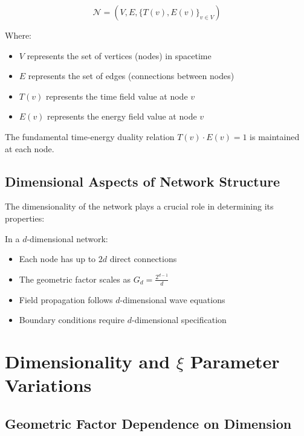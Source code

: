 \documentclass[12pt,a4paper]{article}
\begin{document}
	\begin{equation}
		\mathcal{N} = (V, E, \{T(v), E(v)\}_{v \in V})
	\end{equation}
	
	Where:
	\begin{itemize}
		\item $V$ represents the set of vertices (nodes) in spacetime
		\item $E$ represents the set of edges (connections between nodes)
		\item $T(v)$ represents the time field value at node $v$
		\item $E(v)$ represents the energy field value at node $v$
	\end{itemize}
	
	The fundamental time-energy duality relation $T(v) \cdot E(v) = 1$ is maintained at each node.
	
	\subsection{Dimensional Aspects of Network Structure}
	\label{subsec:dimensional_aspects}
	
	The dimensionality of the network plays a crucial role in determining its properties:
	
	\begin{tcolorbox}[colback=blue!5!white,colframe=blue!75!black,title=Dimensional Network Properties]
		In a $d$-dimensional network:
		\begin{itemize}
			\item Each node has up to $2d$ direct connections
			\item The geometric factor scales as $G_d = \frac{2^{d-1}}{d}$
			\item Field propagation follows $d$-dimensional wave equations
			\item Boundary conditions require $d$-dimensional specification
		\end{itemize}
	\end{tcolorbox}
	
	\section{Dimensionality and $\xi$ Parameter Variations}
	\label{sec:dimensionality_xi}
	
	\subsection{Geometric Factor Dependence on Dimension}
	\label{subsec:geometric_factor}
	
\end{document}
